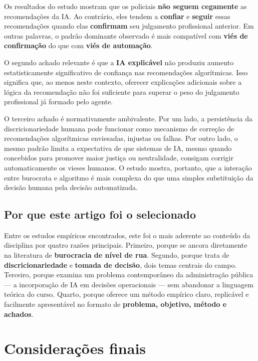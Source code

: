\documentclass[12pt]{article}
\begin{document}
Os resultados do estudo mostram que os policiais \textbf{não seguem cegamente} as recomendações da IA. Ao contrário, eles tendem a \textbf{confiar} e \textbf{seguir} essas recomendações quando elas \textbf{confirmam} seu julgamento profissional anterior. Em outras palavras, o padrão dominante observado é mais compatível com \textbf{viés de confirmação} do que com \textbf{viés de automação}.

O segundo achado relevante é que a \textbf{IA explicável} não produziu aumento estatisticamente significativo de confiança nas recomendações algorítmicas. Isso significa que, ao menos neste contexto, oferecer explicações adicionais sobre a lógica da recomendação não foi suficiente para superar o peso do julgamento profissional já formado pelo agente.

O terceiro achado é normativamente ambivalente. Por um lado, a persistência da discricionariedade humana pode funcionar como mecanismo de correção de recomendações algorítmicas enviesadas, injustas ou falhas. Por outro lado, o mesmo padrão limita a expectativa de que sistemas de IA, mesmo quando concebidos para promover maior justiça ou neutralidade, consigam corrigir automaticamente os vieses humanos. O estudo mostra, portanto, que a interação entre burocrata e algoritmo é mais complexa do que uma simples substituição da decisão humana pela decisão automatizada.

\subsection{Por que este artigo foi o selecionado}
\label{sec:orgc805ddd}

Entre os estudos empíricos encontrados, este foi o mais aderente ao conteúdo da disciplina por quatro razões principais. Primeiro, porque se ancora diretamente na literatura de \textbf{burocracia de nível de rua}. Segundo, porque trata de \textbf{discricionariedade} e \textbf{tomada de decisão}, dois temas centrais do campo. Terceiro, porque examina um problema contemporâneo da administração pública — a incorporação de IA em decisões operacionais — sem abandonar a linguagem teórica do curso. Quarto, porque oferece um método empírico claro, replicável e facilmente apresentável no formato de \textbf{problema, objetivo, método e achados}.

\section{Considerações finais}
\label{sec:orgd6132f3}
\end{document}
